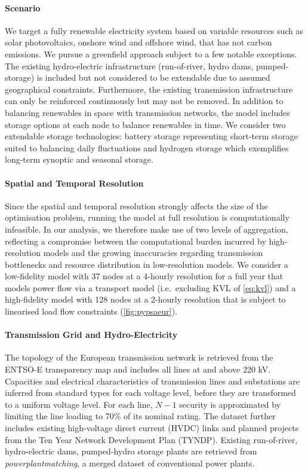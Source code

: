 \paragraph{Scenario}
We target a fully renewable electricity system based on variable resources such
as solar photovoltaics, onshore wind and offshore wind, that has not carbon
emissions. We pursue a greenfield approach subject to a few notable exceptions.
The existing hydro-electric infrastructure (run-of-river, hydro dams,
pumped-storage) is included but not considered to be extendable due to assumed
geographical constraints. Furthermore, the existing transmission infrastructure
can only be reinforced continuously but may not be removed. In addition to
balancing renewables in space with transmission networks, the model includes
storage options at each node to balance renewables in time. We consider two extendable
storage technologies: battery storage representing short-term storage suited to
balancing daily fluctuations and hydrogen storage which exemplifies
long-term synoptic and seasonal storage.

\paragraph{Spatial and Temporal Resolution}
Since the spatial and temporal resolution strongly affects the size of the
optimisation problem, running the model at full resolution is computationally
infeasible. In our analysis, we therefore make use of two levels of
aggregation, reflecting a compromise between the computational burden incurred
by high-resolution models and the growing inaccuracies regarding transmission
bottlenecks and resource distribution in low-resolution models. We consider a
low-fidelity model with 37 nodes at a 4-hourly resolution for a full year that
models power flow via a transport model (i.e.~excluding KVL of \cref{eq:kvl})
and a high-fidelity model with 128 nodes at a 2-hourly resolution that is
subject to linearised load flow constraints (\cref{fig:pypsaeur}).


\paragraph{Transmission Grid and Hydro-Electricity}
The topology of the European transmission network is retrieved from the ENTSO-E
transparency map and includes all lines at and above 220 kV. Capacities and
electrical characteristics of transmission lines and substations are inferred
from standard types for each voltage level, before they are transformed to a
uniform voltage level. For each line, $N-1$ security is approximated by limiting
the line loading to 70\% of its nominal rating. The dataset further includes
existing high-voltage direct current (HVDC) links and planned projects from the
Ten Year Network Development Plan (TYNDP). Existing run-of-river, hydro-electric
dams, pumped-hydro storage plants are retrieved from
\textit{powerplantmatching}, a merged dataset of conventional power plants.

